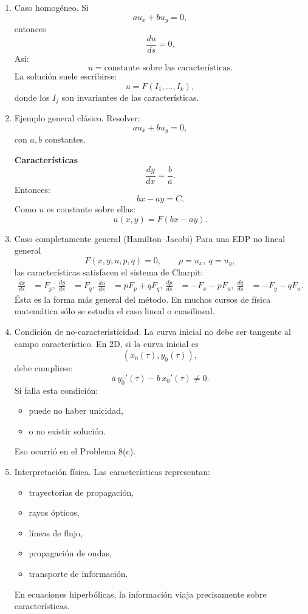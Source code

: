\documentclass[11pt,spanish]{article}
\begin{document}
\begin{enumerate}
Plantear:
$$
\frac{dx}{ds}=a,
\qquad
\frac{dy}{ds}=b,
\qquad
\frac{du}{ds}=c.
$$

{\bf  Paso 3}

Resolver las ecuaciones para $x(s),y(s)$.
Muchas veces:
$$
\frac{dy}{dx}=\frac{b}{a}.
$$

{\bf Paso 4}

Resolver:
$$
\frac{du}{ds}=c.
$$

{\bf Paso 5}

Usar los datos iniciales para determinar constantes.

\item Caso homogéneo.
Si
$$
a u_x+b u_y=0,
$$
entonces
$$
\frac{du}{ds}=0.
$$
Así:
$$
u=\text{constante sobre las características}.
$$
La solución suele escribirse:
$$
u=F(I_1,\dots,I_k),
$$
donde los $I_j$ son invariantes de las características.

\item Ejemplo general clásico.
Resolver:
$$
a u_x+b u_y=0,
$$
con $a,b$ constantes.

{\bf Características}
$$
\frac{dy}{dx}=\frac{b}{a}.
$$
Entonces:
$$
bx-ay=C.
$$
Como $u$ es constante sobre ellas:
$$
\boxed{
u(x,y)=F(bx-ay).
}
$$

\item Caso completamente general (Hamilton–Jacobi)
Para una EDP no lineal general
$$
F(x,y,u,p,q)=0,
\qquad
p=u_x,\ q=u_y,
$$
las características satisfacen el sistema de Charpit:
$$
\boxed{
\begin{aligned}
\frac{dx}{ds}&=F_p,\
\frac{dy}{ds}&=F_q,\
\frac{du}{ds}&=pF_p+qF_q,\
\frac{dp}{ds}&=-F_x-pF_u,\
\frac{dq}{ds}&=-F_y-qF_u.
\end{aligned}
}
$$
Ésta es la forma más general del método.
En muchos cursos de física matemática sólo se estudia el caso lineal o cuasilineal.

\item Condición de no-caracteristicidad.
La curva inicial no debe ser tangente al campo característico.
En 2D, si la curva inicial es
$$
(x_0(\tau),y_0(\tau)),
$$
debe cumplirse:
$$
a\,y_0'(\tau)-b\,x_0'(\tau)\neq0.
$$
Si falla esta condición:
\begin{itemize}
\item puede no haber unicidad,
\item o no existir solución.
\end{itemize}
Eso ocurrió en el Problema 8(c).

\item Interpretación física.
Las características representan:
\begin{itemize}
\item trayectorias de propagación,
\item rayos ópticos,
\item líneas de flujo,
\item propagación de ondas,
\item transporte de información.
\end{itemize}
En ecuaciones hiperbólicas, la información viaja precisamente sobre características.

\end{enumerate}
\end{document}
